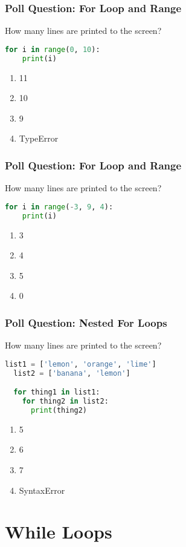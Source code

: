 \documentclass{beamer}
\begin{document}
%
%
\begin{frame}[fragile]
  \frametitle{Poll Question: For Loop and Range}
  How many lines are printed to the screen?
  \begin{lstlisting}[language=Python, autogobble]
  for i in range(0, 10):
    print(i)
  \end{lstlisting}
  \vfill
  \begin{enumerate}[A]
    \item 11
    \item 10
    \item 9
    \item TypeError
  \end{enumerate}
\end{frame}

%
%
\begin{frame}[fragile]
  \frametitle{Poll Question: For Loop and Range}
  How many lines are printed to the screen?
  \begin{lstlisting}[language=Python, autogobble]
  for i in range(-3, 9, 4):
    print(i)
  \end{lstlisting}
  \vfill
  \begin{enumerate}[A]
    \item 3
    \item 4
    \item 5
    \item 0
  \end{enumerate}
\end{frame}

%
%
\begin{frame}[fragile]
  \frametitle{Poll Question: Nested For Loops}
  How many lines are printed to the screen?
  \begin{lstlisting}[language=Python, autogobble]
  list1 = ['lemon', 'orange', 'lime']
  list2 = ['banana', 'lemon']

  for thing1 in list1:
    for thing2 in list2:
      print(thing2)
  \end{lstlisting}
  \vfill
  \begin{enumerate}[A]
    \item 5
    \item 6
    \item 7
    \item SyntaxError
  \end{enumerate}
\end{frame}

\section{While Loops}
\end{document}
